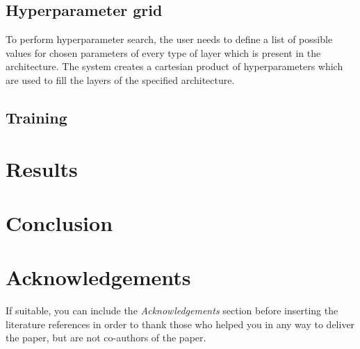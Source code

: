 \documentclass[10pt, a4paper]{article}
\begin{document}
\subsection{Hyperparameter grid}
To perform hyperparameter search, the user needs to define
a list of possible values for chosen parameters of every type
of layer which is present in the architecture.
The system creates a cartesian product of hyperparameters
which are used to fill the layers of the specified architecture.


\subsection{Training}

\section{Results}

\section{Conclusion}



\section*{Acknowledgements}

If suitable, you can include the \textit{Acknowledgements} section before inserting the literature references  in order to thank those who helped you in any way to deliver the paper, but are not co-authors of the paper.


 
\end{document}
